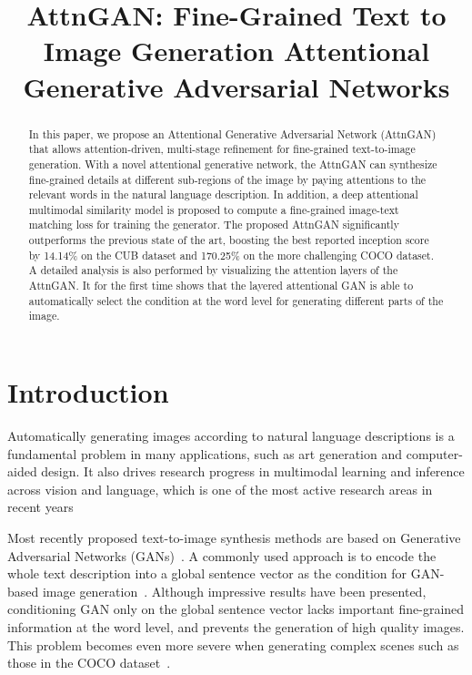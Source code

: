 \title{AttnGAN: Fine-Grained Text to Image Generation Attentional Generative Adversarial Networks}

\begin{abstract}
In this paper, we propose an Attentional Generative Adversarial Network (AttnGAN) that allows attention-driven, multi-stage refinement for fine-grained text-to-image generation.  With a novel attentional generative network, the AttnGAN can synthesize fine-grained details at different sub-regions of the image by paying attentions to the relevant words in the natural language description. In addition, a deep attentional multimodal similarity model is proposed to compute a fine-grained image-text matching loss for training the generator. The proposed AttnGAN significantly outperforms the previous state of the art, boosting the best reported inception score by 14.14\% on the CUB dataset and 170.25\% on the more challenging COCO dataset. A detailed analysis is also performed by visualizing the attention layers of the AttnGAN. It for the first time shows that the layered attentional GAN is able to automatically select the condition at the word level for generating different parts of the image.
\end{abstract}

\section{Introduction}

Automatically generating images according to natural language descriptions is a fundamental problem in many applications, such as art generation and computer-aided design. It also drives research progress in multimodal learning and inference across vision and language, which is one of the most active research areas in recent years~\cite{reed2016generative,reed2016learning,Han16stackgan,reed2016cvpr,FangGISDDGHMPZZ15,XuBKCCSZB15,SCN_CVPR2017, AgrawalLAMZPB17,YangHGDS16}

Most recently proposed text-to-image synthesis methods are based on Generative Adversarial Networks (GANs)~\cite{goodfellow2014generative}. A commonly used approach is to encode the whole text description into a global sentence vector as the condition for GAN-based image generation~\cite{reed2016generative,reed2016learning,Han16stackgan,Han17stackgan2}. Although impressive results have been presented, conditioning GAN only on the global sentence vector lacks important fine-grained information at the word level, and prevents the generation of high quality images. This problem becomes even more severe when generating complex scenes such as those in the COCO dataset~\cite{LinMBHPRDZ14}. 

